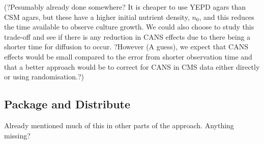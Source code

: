(?Pesumably already done somewhere? It is cheaper to use YEPD agars
than CSM agars, but these have a higher initial nutrient density,
\(n_{0}\), and this reduces the time available to observe culture
growth. We could also choose to study this trade-off and see if there
is any reduction in CANS effects due to there being a shorter time for
diffusion to occur. ?However (A guess), we expect that CANS effects
would be small compared to the error from shorter observation time and
that a better approach would be to correct for CANS in CMS data either
directly or using randomisation.?)


\subsection{Package and Distribute}
\label{sec:package-distribute}
Already mentioned much of this in other parts of the
approach. Anything missing?

